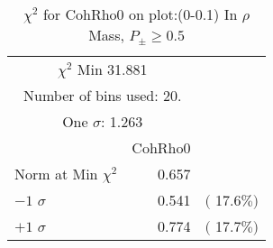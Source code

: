  \begin{table}[h!]\centering
 {\small{
 \begin{tabular}{||l||r||r||}
 \hline
 \hline
\multicolumn{2}{||c||}{$\chi^{2}$ Min  31.881} & \\
 \multicolumn{2}{||c||}{Number of bins used:   20.} & \\
\multicolumn{2}{||c||}{One $\sigma$:    1.263} & \\
 \hline
 \hline
    & CohRho0 & \\
Norm at Min $\chi^{2}$  &   0.657 & \\
$-1$ $\sigma$ &   0.541  &  $($ 17.6$\%)$  \\
$+1$ $\sigma$ &   0.774  &  $($ 17.7$\%)$  \\
 \hline
 \hline
 \end{tabular}
 \caption{$\chi^{2}$ for CohRho0 on plot:\ztrz (0-0.1) In $\rho$ Mass, $P_\pm \geq 0.5$}
 \label{tab-chicoh}
 }}
 \end{table}
 \endinput
